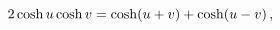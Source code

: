 \[2\mathop{\cosh\/}\nolimits u\mathop{\cosh\/}\nolimits v=\mathop{\cosh\/}%
\nolimits\!\left(u+v\right)+\mathop{\cosh\/}\nolimits\!\left(u-v\right),\]